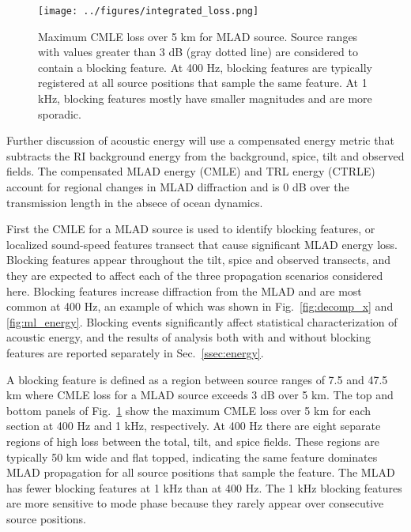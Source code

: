 \documentclass[preprint,NumberedRefs]{JASA}
\begin{document}
\begin{figure}
\texttt{[image: ../figures/integrated\_loss.png]}
    \caption{Maximum CMLE loss over 5 km for MLAD source. Source ranges with values greater than 3 dB (gray dotted line) are considered to contain a blocking feature. At 400 Hz, blocking features are typically registered at all source positions that sample the same feature. At 1 kHz, blocking features mostly have smaller magnitudes and are more sporadic.}
    \label{fig:blocking}
\end{figure}
Further discussion of acoustic energy will use a compensated energy metric that subtracts the RI background energy from the background, spice, tilt and observed fields. The compensated MLAD energy (CMLE) and TRL energy (CTRLE) account for regional changes in MLAD diffraction and is 0 dB over the transmission length in the absece of ocean dynamics.

First the CMLE for a MLAD source is used to identify blocking features, or localized sound-speed features transect that cause significant MLAD energy loss. Blocking features appear throughout the tilt, spice and observed transects, and they are expected to affect each of the three propagation scenarios considered here. Blocking features increase diffraction from the MLAD and are most common at 400 Hz, an example of which was shown in Fig.~\ref{fig:decomp_x} and \ref{fig:ml_energy}. Blocking events significantly affect statistical characterization of acoustic energy, and the results of analysis both with and without blocking features are reported separately in Sec.~\ref{ssec:energy}.

A blocking feature is defined as a region between source ranges of 7.5 and 47.5 km where CMLE loss for a MLAD source exceeds 3 dB over 5 km. The top and bottom panels of Fig.~\ref{fig:blocking} show the maximum CMLE loss over 5 km for each section at 400 Hz and 1 kHz, respectively. At 400 Hz there are eight separate regions of high loss between the total, tilt, and spice fields. These regions are typically 50 km wide and flat topped, indicating the same feature dominates MLAD propagation for all source positions that sample the feature. The MLAD has fewer blocking features at 1 kHz than at 400 Hz. The 1 kHz blocking features are more sensitive to mode phase because they rarely appear over consecutive source positions.
\end{document}
